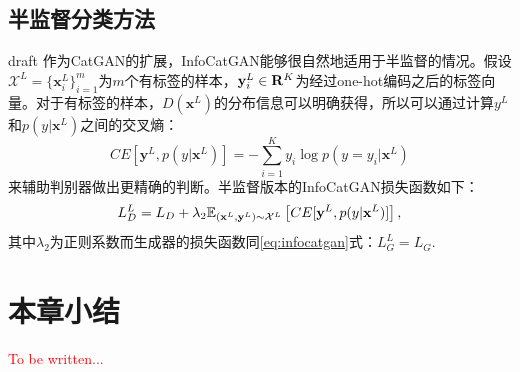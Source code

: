 \subsection{半监督分类方法}\label{sec:ss-infocatgan}
draft
作为CatGAN的扩展，InfoCatGAN能够很自然地适用于半监督的情况。假设$\mathcal{X}^L = \{\mathbf{x}_i^L\}_{i=1}^m$为$m$个有标签的样本，$\mathbf{y}_i^L \in \mathbf{R}^K$为经过one-hot编码之后的标签向量。对于有标签的样本，$D(\mathbf{x}^L)$的分布信息可以明确获得，所以可以通过计算$y^L$和$p(y|\mathbf{x}^L)$之间的交叉熵：
\begin{equation}
  \label{eq:celoss}
  CE[\mathbf{y}^L, p(y|\mathbf{x}^L)] = -\sum_{i=1}^K y_i \log p(y=y_i | \mathbf{x}^L)
\end{equation}
来辅助判别器做出更精确的判断。半监督版本的InfoCatGAN损失函数如下：
\begin{equation}
  L_D^L = L_D + \lambda_2 \mathbb{E}_{(\mathbf{x}^L, \mathbf{y}^L) \sim \mathcal{X}^L}\left[ CE[\mathbf{y}^L, p(y|\mathbf{x}^L)] \right],
\end{equation}
其中$\lambda_2$为正则系数而生成器的损失函数同\eqref{eq:infocatgan}式：$L_G^L = L_G$.

\section{本章小结}
\textcolor{red}{To be written...}
